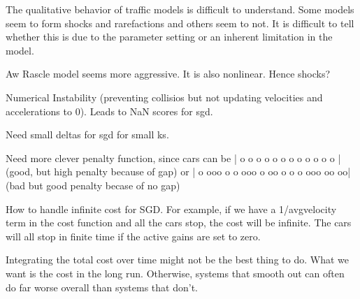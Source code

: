 \documentclass[11pt]{article}
\begin{document}
\begin{multicols}{2}
The qualitative behavior of traffic models is difficult to understand. Some models seem to form shocks and rarefactions and others seem to not. It is difficult to tell whether this is due to the parameter setting or an inherent limitation in the model.

Aw Rascle model seems more aggressive. It is also nonlinear. Hence shocks?

Numerical Instability (preventing collisios but not updating velocities and accelerations to 0). Leads to NaN scores for sgd.

Need small deltas for sgd for small ks.

Need more clever penalty function, since cars can be | o o o o o o o o o           o o o | (good, but high penalty because of gap) or | o ooo o o ooo o oo o o o ooo oo  oo| (bad but good penalty becase of no gap)

How to handle infinite cost for SGD. For example, if we have a 1/avgvelocity term in the cost function and all the cars stop, the cost will be infinite. The cars will all stop in finite time if the active gains are set to zero.

Integrating the total cost over time might not be the best thing to do. What we want is the cost in the long run. Otherwise, systems that smooth out can often do far worse overall than systems that don't.

\end{multicols}
\end{document}
